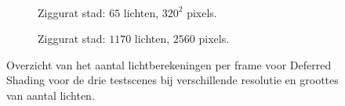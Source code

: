 \begin{figure}[t]
\begin{adjustbox}{minipage=\textwidth, scale=0.55}
\begin{subfigure}[b]{0.8\textwidth}
      \label{fig:cs-lc-frames-deferred:alley-high}
    \end{subfigure}
  \end{adjustbox} \\
  \begin{adjustbox}{minipage=\textwidth, scale=0.55}
    \begin{subfigure}[b]{0.8\textwidth}
      \centering
      \def\svgwidth{\textwidth}
      
      \caption{Ziggurat stad: $65$ lichten, $320^2$ pixels.}
      \label{fig:cs-lc-frames-deferred:city-low}
    \end{subfigure}
  \end{adjustbox}\hspace{-0.075\textwidth}  %
  \begin{adjustbox}{minipage=\textwidth, scale=0.55}
    \begin{subfigure}[b]{0.8\textwidth}
      \centering
      \def\svgwidth{\textwidth}
      
      \caption{Ziggurat stad: $1170$ lichten, $2560$ pixels.}
      \label{fig:cs-lc-frames-deferred:city-high}
    \end{subfigure}
  \end{adjustbox}
  \caption{Overzicht van het aantal lichtberekeningen per frame voor Deferred Shading
           voor de drie testscenes bij verschillende resolutie en groottes van aantal
           lichten.}
  \label{fig:cs-lc-frames-deferred}
\end{figure}

